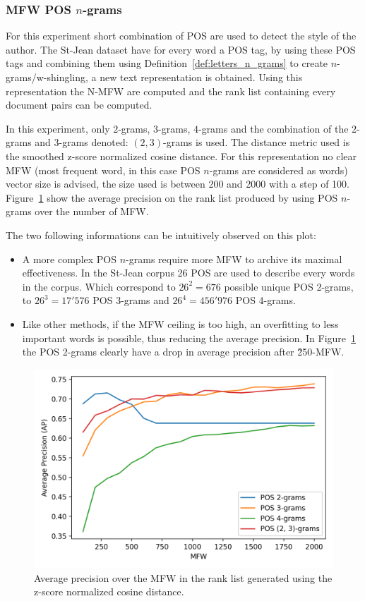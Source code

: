 \subsubsection{MFW POS $n$-grams}

For this experiment short combination of POS are used to detect the style of the author.
The St-Jean dataset have for every word a POS tag, by using these POS tags and combining them using Definition~\ref{def:letters_n_grams} to create $n$-grams/w-shingling, a new text representation is obtained.
Using this representation the N-MFW are computed and the rank list containing every document pairs can be computed.

In this experiment, only $2$-grams, $3$-grams, $4$-grams and the combination of the $2$-grams and $3$-grams denoted: $(2, 3)$-grams is used.
The distance metric used is the smoothed z-score normalized cosine distance.
For this representation no clear MFW (most frequent word, in this case POS $n$-grams are considered as words) vector size is advised, the size used is between 200 and 2000 with a step of 100.
Figure~\ref{fig:pos_ngrams} show the average precision on the rank list produced by using POS $n$-grams over the number of MFW.

The two following informations can be intuitively observed on this plot:
\begin{itemize}
  \item
  A more complex POS $n$-grams require more MFW to archive its maximal effectiveness.
  In the St-Jean corpus 26 POS are used to describe every words in the corpus.
  Which correspond to $26^2 = 676$ possible unique POS 2-grams, to $26^3 = 17'576$ POS 3-grams and $26^4 = 456'976$ POS 4-grams.
  \item
  Like other methods, if the MFW ceiling is too high, an overfitting to less important words is possible, thus reducing the average precision.
  In Figure~\ref{fig:pos_ngrams} the POS 2-grams clearly have a drop in average precision after \~250-MFW.
\end{itemize}

\begin{figure}
  \centering
  \caption{Average precision over the MFW in the rank list generated using the z-score normalized cosine distance.}
  \label{fig:pos_ngrams}
  \includegraphics[width=\linewidth]{img/pos_ngrams.png}
\end{figure}

